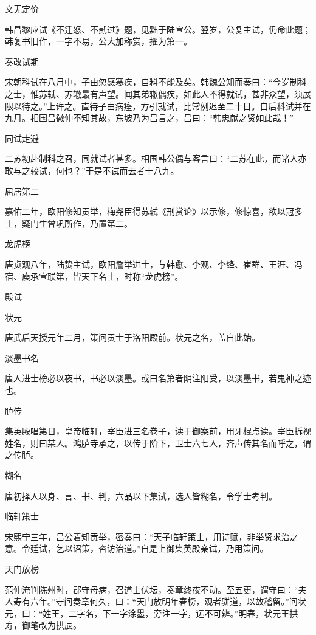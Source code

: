 \documentclass[a4paper,12pt,UTF8,twoside]{ctexbook}
\begin{document}
    文无定价
    
    韩昌黎应试《不迁怒、不贰过》题，见黜于陆宣公。翌岁，公复主试，仍命此题；韩复书旧作，一字不易，公大加称赏，擢为第一。
    
    奏改试期
    
    宋朝科试在八月中，子由忽感寒疾，自料不能及矣。韩魏公知而奏曰：“今岁制科之士，惟苏轼、苏辙最有声望。闻其弟辙偶疾，如此人不得就试，甚非众望，须展限以待之。”上许之。直待子由病痊，方引就试，比常例迟至二十日。自后科试并在九月。相国吕徽仲不知其故，东坡乃为吕言之，吕曰：“韩忠献之贤如此哉！”
    
    同试走避
    
    二苏初赴制科之召，同就试者甚多。相国韩公偶与客言曰：“二苏在此，而诸人亦敢与之较试，何也？”于是不试而去者十八九。
    
    屈居第二
    
    嘉佑二年，欧阳修知贡举，梅尧臣得苏轼《刑赏论》以示修，修惊喜，欲以冠多士，疑门生曾巩所作，乃置第二。
    
    龙虎榜
    
    唐贞观八年，陆贽主试，欧阳詹举进士，与韩愈、李观、李绛、崔群、王涯、冯宿、庾承宣联第，皆天下名士，时称“龙虎榜”。
    
    殿试
    
    状元
    
    唐武后天授元年二月，策问贡士于洛阳殿前。状元之名，盖自此始。
    
    淡墨书名
    
    唐人进士榜必以夜书，书必以淡墨。或曰名第者阴注阳受，以淡墨书，若鬼神之迹也。
    
    胪传
    
    集英殿唱第日，皇帝临轩，宰臣进三名卷子，读于御案前，用牙棍点读。宰臣拆视姓名，则曰某人。鸿胪寺承之，以传于阶下，卫士六七人，齐声传其名而呼之，谓之传胪。
    
    糊名
    
    唐初择人以身、言、书、判，六品以下集试，选人皆糊名，令学士考判。
    
    临轩策士
    
    宋熙宁三年，吕公着知贡举，密奏曰：“天子临轩策士，用诗赋，非举贤求治之意。令廷试，乞以诏策，咨访治道。”自是上御集英殿亲试，乃用策问。
    
    天门放榜
    
    范仲淹判陈州时，郡守母病，召道士伏坛，奏章终夜不动。至五更，谓守曰：“夫人寿有六年。”守问奏章何久，曰：“天门放明年春榜，观者骈道，以故稽留。”问状元，曰：“姓王，二字名，下一字涂墨，旁注一字，远不可辨。”明春，状元王拱寿，御笔改为拱辰。
    
\end{document}
